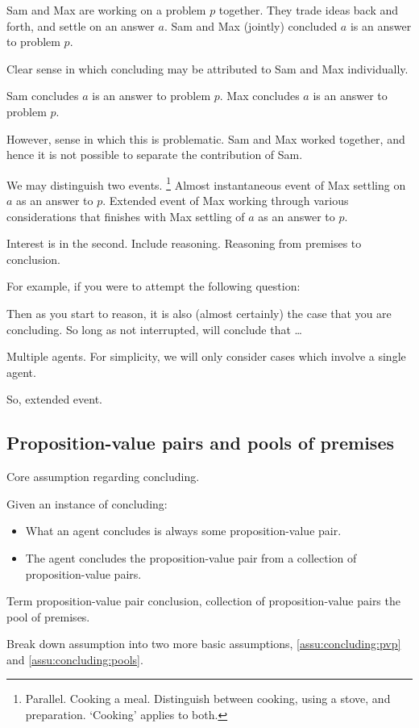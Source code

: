 \begin{note}
  Sam and Max are working on a problem \(p\) together.
  They trade ideas back and forth, and settle on an answer \(a\).
  Sam and Max (jointly) concluded \(a\) is an answer to problem \(p\).

  Clear sense in which concluding may be attributed to Sam and Max individually.

  Sam concludes \(a\) is an answer to problem \(p\).
  Max concludes \(a\) is an answer to problem \(p\).

  However, sense in which this is problematic.
  Sam and Max worked together, and hence it is not possible to separate the contribution of Sam.

  We may distinguish two events.%
  \footnote{
    Parallel.
    Cooking a meal.
    Distinguish between cooking, using a stove, and preparation.
    `Cooking' applies to both.
  }
  Almost instantaneous event of Max settling on \(a\) as an answer to \(p\).
  Extended event of Max working through various considerations that finishes with Max settling of \(a\) as an answer to \(p\).

  Interest is in the second.
  Include reasoning.
  Reasoning from premises to conclusion.

  For example, if you were to attempt the following question:


  Then as you start to reason,  it is also (almost certainly) the case that you are concluding.
  So long as not interrupted, will conclude that \dots

  Multiple agents.
  For simplicity, we will only consider cases which involve a single agent.

  So, extended event.
\end{note}

\subsection{Proposition-value pairs and pools of premises}

\begin{note}
  Core assumption regarding concluding.

  \begin{assumption}
    Given an instance of concluding:
    \begin{itemize}
    \item
      What an agent concludes is always some proposition-value pair.
    \item
      The agent concludes the proposition-value pair from a collection of proposition-value pairs.
    \end{itemize}
    \vspace{-\baselineskip}
  \end{assumption}

  Term proposition-value pair conclusion, collection of proposition-value pairs the pool of premises.

  Break down assumption into two more basic assumptions, \ref{assu:concluding:pvp} and \ref{assu:concluding:pools}.
\end{note}


